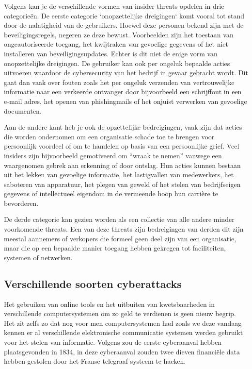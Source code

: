 Volgens \textcite{Cisa2025} kan je de verschillende vormen van insider threats opdelen in drie categorieën. De eerste categorie `onopzettelijke dreigingen` komt vooral tot stand door de nalatigheid van de gebruikers.  Hoewel deze personen bekend zijn met de beveiligingsregels, negeren ze deze bewust. Voorbeelden zijn het toestaan van ongeautoriseerde toegang, het kwijtraken van gevoelige gegevens of het niet installeren van beveiligingsupdates. Echter is dit niet de enige vorm van onopzettelijke dreigingen. De gebruiker kan ook per ongeluk bepaalde acties uitvoeren waardoor de cybersecurity van het bedrijf in gevaar gebracht wordt. Dit gaat dan vaak over fouten zoals het per ongeluk verzenden van vertrouwelijke informatie naar een verkeerde ontvanger door bijvoorbeeld een schrijffout in een e-mail adres, het openen van phishingmails of het onjuist verwerken van gevoelige documenten.

Aan de andere kant heb je ook de opzettelijke bedreigingen, vaak zijn dat acties die worden ondernomen om een organisatie schade toe te brengen voor persoonlijk voordeel of om te handelen op basis van een persoonlijke grief. Veel insiders zijn bijvoorbeeld gemotiveerd om “wraak te nemen” vanwege een waargenomen gebrek aan erkenning of door ontslag. Hun acties kunnen bestaan uit het lekken van gevoelige informatie, het lastigvallen van medewerkers, het saboteren van apparatuur, het plegen van geweld of het stelen van bedrijfseigen gegevens of intellectueel eigendom in de vermeende hoop hun carrière te bevorderen.\autocite{Cisa2025}

De derde categorie kan gezien worden als een collectie van alle andere minder voorkomende threats. Een van deze threats zijn bedreigingen van derden dit zijn meestal aannemers of verkopers die formeel geen deel zijn van een organisatie, maar die op een bepaalde manier toegang hebben gekregen tot faciliteiten, systemen of netwerken. \autocite{Cisa2025}



\subsection{Verschillende soorten cyberattacks}
Het gebruiken van online tools en het uitbuiten van kwetsbaarheden in verschillende computersystemen om zo geld te verdienen is geen nieuw begrip. Het zit zelfs zo dat nog voor men computersystemen had zoals we deze vandaag kennen er al verschillende elektronische communicatie systemen werden gebruikt voor het stelen van informatie. Volgens \textcite{Monroe2025} zou de eerste cyberaanval hebben plaatsgevonden in 1834, in deze cyberaanval zouden twee dieven financiële data hebben gestolen door het Franse telegraaf systeem te hacken. 

